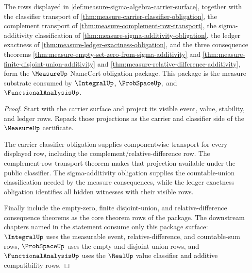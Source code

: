 \begin{theorem}
\label{thm:measure-namecert-obligation-package}
The rows displayed in
\autoref{def:measure-sigma-algebra-carrier-surface}, together with the
classifier transport of
\autoref{thm:measure-carrier-classifier-obligation}, the complement transport
of \autoref{thm:measure-complement-row-transport}, the sigma-additivity
classification of \autoref{thm:measure-sigma-additivity-obligation}, the
ledger exactness of \autoref{thm:measure-ledger-exactness-obligation}, and the
three consequence theorems
\autoref{thm:measure-empty-set-zero-from-sigma-additivity} and
\autoref{thm:measure-finite-disjoint-union-additivity} and
\autoref{thm:measure-relative-difference-additivity}, form the
$\MeasureUp$ NameCert obligation package. This package is the measure substrate
consumed by $\IntegralUp$, $\ProbSpaceUp$, and $\FunctionalAnalysisUp$.
\end{theorem}
\begin{proof}
Start with the carrier surface and project its visible event, value, stability,
and ledger rows. Repack those projections as the carrier and classifier side of
the $\MeasureUp$ certificate.

The carrier-classifier obligation supplies componentwise transport for every
displayed row, including the complement/relative-difference row. The
complement-row transport theorem makes that projection available under the
public classifier. The sigma-additivity obligation supplies the countable-union
classification needed by the measure consequences, while the ledger exactness
obligation identifies all hidden witnesses with their visible rows.

Finally include the empty-zero, finite disjoint-union, and
relative-difference consequence theorems as the core theorem rows of the
package. The downstream chapters named in the statement consume only this
package surface: $\IntegralUp$ uses the measurable event, relative-difference,
and countable-sum rows, $\ProbSpaceUp$ uses the empty and disjoint-union rows,
and $\FunctionalAnalysisUp$ uses the $\RealUp$ value classifier and additive
compatibility rows.
\end{proof}

